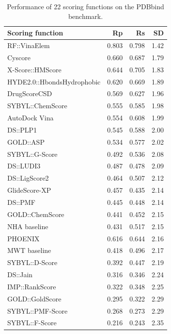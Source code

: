 \begin{table}
\caption{Performance of 22 scoring functions on the PDBbind benchmark.}
\label{rfscore3:trn1105tst195}
\begin{tabular}{lrrr}
\hline
Scoring function & Rp & Rs & SD\\
\hline
RF::VinaElem               & 0.803 & 0.798 & 1.42\\
Cyscore                    & 0.660 & 0.687 & 1.79\\
X-Score::HMScore           & 0.644 & 0.705 & 1.83\\
HYDE2.0::HbondsHydrophobic & 0.620 & 0.669 & 1.89\\
DrugScoreCSD               & 0.569 & 0.627 & 1.96\\
SYBYL::ChemScore           & 0.555 & 0.585 & 1.98\\
AutoDock Vina              & 0.554 & 0.608 & 1.99\\
DS::PLP1                   & 0.545 & 0.588 & 2.00\\
GOLD::ASP                  & 0.534 & 0.577 & 2.02\\
SYBYL::G-Score             & 0.492 & 0.536 & 2.08\\
DS::LUDI3                  & 0.487 & 0.478 & 2.09\\
DS::LigScore2              & 0.464 & 0.507 & 2.12\\
GlideScore-XP              & 0.457 & 0.435 & 2.14\\
DS::PMF                    & 0.445 & 0.448 & 2.14\\
GOLD::ChemScore            & 0.441 & 0.452 & 2.15\\
NHA baseline               & 0.431 & 0.517 & 2.15\\
PHOENIX                    & 0.616 & 0.644 & 2.16\\
MWT baseline               & 0.418 & 0.496 & 2.17\\
SYBYL::D-Score             & 0.392 & 0.447 & 2.19\\
DS::Jain                   & 0.316 & 0.346 & 2.24\\
IMP::RankScore             & 0.322 & 0.348 & 2.25\\
GOLD::GoldScore            & 0.295 & 0.322 & 2.29\\
SYBYL::PMF-Score           & 0.268 & 0.273 & 2.29\\
SYBYL::F-Score             & 0.216 & 0.243 & 2.35\\
\hline
\end{tabular}
\end{table}

